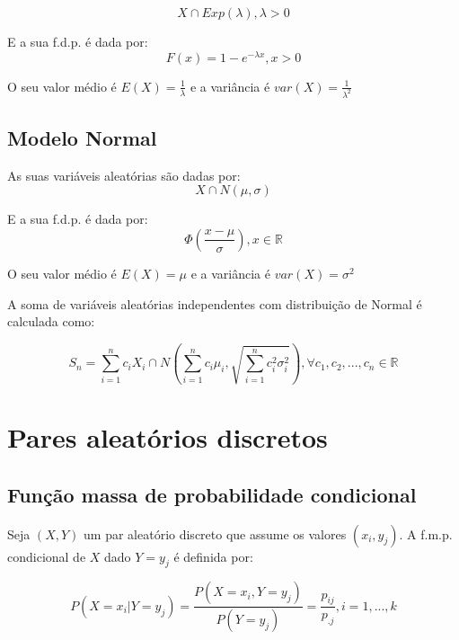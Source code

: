 \documentclass[10pt,a4paper]{report}
\begin{document}
$$
X \cap Exp(\lambda), \lambda > 0
$$

E a sua f.d.p. é dada por:\\

$$
F(x) = 1 - e^{-\lambda x}, x > 0
$$

\vspace{0.7cm}

O seu valor médio é $E(X)=\frac{1}{\lambda}$ e a variância é $var(X)=\frac{1}{\lambda^2}$

\subsection{Modelo Normal}

As suas variáveis aleatórias s\~ao dadas por:\\

$$
X \cap N(\mu , \sigma)
$$

E a sua f.d.p. é dada por:\\

$$
\Phi \left(\frac{x-\mu}{\sigma} \right), x \in \mathbb{R}
$$

\vspace{0.7cm}

O seu valor médio é $E(X)=\mu$ e a variância é $var(X)=\sigma^2$

\vspace{0.7cm}

A soma de variáveis aleatórias independentes com distribuiç\~ao de Normal  é calculada como:

$$
S_n = \sum_{i=1}^{n} c_i X_i \cap N\left(\sum_{i=1}^{n} c_i \mu_i, \sqrt{\sum_{i=1}^{n} c_i^2 \sigma_i^2}\right), \forall c_1, c_2, ..., c_n \in \mathbb{R}
$$

\section{Pares aleatórios discretos}
\subsection{Funç\~ao massa de probabilidade condicional}

\vspace{0.7cm}

Seja $(X, Y)$ um par aleatório discreto que assume os valores
$(x_i, y_j)$. A f.m.p. condicional de $X$ dado $Y = y_j$ é definida por:

\vspace{0.7cm}

$$
P(X = x_i|Y = y_j) = \frac{P(X = x_i, Y = y_j)}{P(Y = y_j)} = \frac{p_{ij}}{p_{.j}}, i = 1, ..., k
$$
\end{document}
